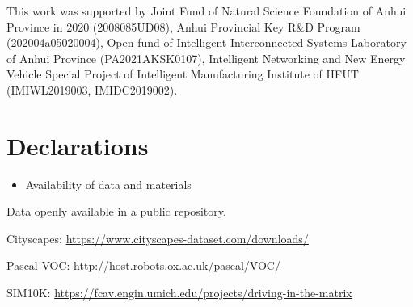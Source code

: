 \documentclass[sn-mathphys]{sn-jnl}%
\theoremstyle{thmstyleone}%
\theoremstyle{thmstyletwo}%
\theoremstyle{thmstylethree}%
\begin{document}
%
%

 This work was supported by Joint Fund of Natural Science Foundation of Anhui Province in 2020 (2008085UD08), Anhui Provincial Key R\&D Program (202004a05020004), Open fund of Intelligent Interconnected Systems Laboratory of Anhui Province (PA2021AKSK0107), Intelligent Networking and New Energy Vehicle Special Project of Intelligent Manufacturing Institute of HFUT (IMIWL2019003, IMIDC2019002).

\section*{Declarations}

\begin{itemize}
	\item Availability of data and materials
\end{itemize}

Data openly available in a public repository. 


\bigskip\noindent
Cityscapes: \url{https://www.cityscapes-dataset.com/downloads/}

\bigskip\noindent
Pascal VOC: \url{http://host.robots.ox.ac.uk/pascal/VOC/}

\bigskip\noindent
SIM10K: \url{https://fcav.engin.umich.edu/projects/driving-in-the-matrix}



\end{document}
